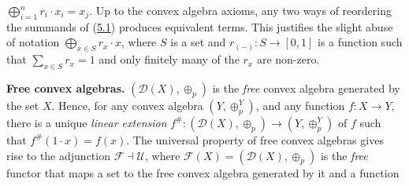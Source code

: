 \documentclass[11pt,a4paper]{amsart}
\begin{document}
\hypertarget{html:S5.SS0.SSS0.P0.SPx1.p2.m7}{}\({\bigoplus_{i=1}^{n}r_{i}\cdot x_{i}=x_{j}}\). Up to the convex algebra axioms, any two ways of reordering the summands of (\hyperlink{html:S5.E1}{5.1}) produces equivalent terms. This justifies the slight abuse of notation %
\hypertarget{html:S5.SS0.SSS0.P0.SPx1.p2.m8}{}\({\bigoplus_{x\in S}r_{x}\cdot x}\), where %
\hypertarget{html:S5.SS0.SSS0.P0.SPx1.p2.m9}{}\({S}\) is a set and %
\hypertarget{html:S5.SS0.SSS0.P0.SPx1.p2.m10}{}\({r_{(-)}\colon S\to[0,1]}\) is a function such that %
\hypertarget{html:S5.SS0.SSS0.P0.SPx1.p2.m11}{}\({\sum_{x\in S}r_{x}=1}\) and only finitely many of the %
\hypertarget{html:S5.SS0.SSS0.P0.SPx1.p2.m12}{}\({r_{x}}\) are non-zero.
\par\medskip
\hypertarget{html:S5.SS0.SSS0.P0.SPx2}{} \par\noindent\textbf{Free convex algebras.}\quad  %
\hypertarget{html:S5.SS0.SSS0.P0.SPx2.p1}{} %
\hypertarget{html:S5.SS0.SSS0.P0.SPx2.p1.m1}{}\({({\mathcal{D}}(X),\oplus_{p})}\) is the \emph{free} convex algebra generated by the set %
\hypertarget{html:S5.SS0.SSS0.P0.SPx2.p1.m2}{}\({X}\). Hence, for any convex algebra %
\hypertarget{html:S5.SS0.SSS0.P0.SPx2.p1.m3}{}\({(Y,\oplus^{Y}_{p})}\), and any function %
\hypertarget{html:S5.SS0.SSS0.P0.SPx2.p1.m4}{}\({f\colon X\to Y}\), there is a unique \emph{linear extension} %
\hypertarget{html:S5.SS0.SSS0.P0.SPx2.p1.m5}{}\({f^{\#}\colon({\mathcal{D}}(X),\oplus_{p})\to(Y,\oplus^{Y}_{p})}\) of %
\hypertarget{html:S5.SS0.SSS0.P0.SPx2.p1.m6}{}\({f}\) such that %
\hypertarget{html:S5.SS0.SSS0.P0.SPx2.p1.m7}{}\({f^{\#}(1\cdot x)=f(x)}\). The universal property of free convex algebras gives rise to the adjunction %
\hypertarget{html:S5.SS0.SSS0.P0.SPx2.p1.m8}{}\({\mathcal{F}\dashv\mathcal{U}}\), where %
\hypertarget{html:S5.SS0.SSS0.P0.SPx2.p1.m9}{}\({{\mathcal{F}}(X)=({\mathcal{D}}(X),\oplus_{p})}\) is the \emph{free} functor that maps a set to the free convex algebra generated by it and a function %
\end{document}
